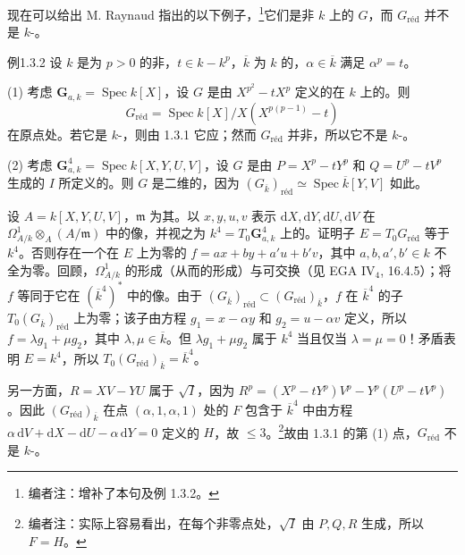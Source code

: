 现在可以给出 M. Raynaud 指出的以下例子，\footnote{编者注：增补了本句及例 1.3.2。}它们是非 $k$ 上的 $G$，而 $G_{\mathrm{r\text{é}d}}$ 并不是 $k$-。
\begin{SGAresult}{例}{1.3.2}
设 $k$ 是为 $p>0$ 的非，$t\in k-k^p$，$\overline k$ 为 $k$ 的，$\alpha\in\overline k$ 满足 $\alpha^p=t$。

(1) 考虑 $\mathbf G_{a,k}=\operatorname{Spec}k[X]$，设 $G$ 是由 $X^{p^2}-tX^p$ 定义的在 $k$ 上的。则
\[
G_{\mathrm{r\text{é}d}}=\operatorname{Spec}k[X]/X(X^{p(p-1)}-t)
\]
在原点处。若它是 $k$-，则由 1.3.1 它应；然而 $G_{\mathrm{r\text{é}d}}$ 并非，所以它不是 $k$-。

(2) 考虑 $\mathbf G_{a,k}^4=\operatorname{Spec}k[X,Y,U,V]$，设 $G$ 是由 $P=X^p-tY^p$ 和 $Q=U^p-tV^p$ 生成的 $I$ 所定义的。则 $G$ 是二维的，因为 $(G_{\overline k})_{\mathrm{r\text{é}d}}\simeq\operatorname{Spec}\overline k[Y,V]$ 如此。

设 $A=k[X,Y,U,V]$，$\mathfrak m$ 为其。以 $x,y,u,v$ 表示 $\mathrm dX,\mathrm dY,\mathrm dU,\mathrm dV$ 在 $\Omega^1_{A/k}\otimes_A(A/\mathfrak m)$ 中的像，并视之为 $k^4=T_0\mathbf G_{a,k}^4$ 上的。证明子 $E=T_0G_{\mathrm{r\text{é}d}}$ 等于 $k^4$。否则存在一个在 $E$ 上为零的 $f=ax+by+a'u+b'v$，其中 $a,b,a',b'\in k$ 不全为零。回顾，$\Omega^1_{A/k}$ 的形成（从而的形成）与可交换（见 EGA IV$_4$, 16.4.5）；将 $f$ 等同于它在 $(\overline k^4)^*$ 中的像。由于 $(G_{\overline k})_{\mathrm{r\text{é}d}}\subset(G_{\mathrm{r\text{é}d}})_{\overline k}$，$f$ 在 $\overline k^4$ 的子 $T_0(G_{\overline k})_{\mathrm{r\text{é}d}}$ 上为零；该子由方程 $g_1=x-\alpha y$ 和 $g_2=u-\alpha v$ 定义，所以 $f=\lambda g_1+\mu g_2$，其中 $\lambda,\mu\in\overline k$。但 $\lambda g_1+\mu g_2$ 属于 $k^4$ 当且仅当 $\lambda=\mu=0$！矛盾表明 $E=k^4$，所以 $T_0(G_{\mathrm{r\text{é}d}})_{\overline k}=\overline k^4$。

另一方面，$R=XV-YU$ 属于 $\sqrt I$，因为 $R^p=(X^p-tY^p)V^p-Y^p(U^p-tV^p)$。因此 $(G_{\mathrm{r\text{é}d}})_{\overline k}$ 在点 $(\alpha,1,\alpha,1)$ 处的 $F$ 包含于 $\overline k^4$ 中由方程 $\alpha\,\mathrm dV+\mathrm dX-\mathrm dU-\alpha\,\mathrm dY=0$ 定义的 $H$，故 $\leq3$。\footnote{编者注：实际上容易看出，在每个非零点处，$\sqrt I$ 由 $P,Q,R$ 生成，所以 $F=H$。}故由 1.3.1 的第 (1) 点，$G_{\mathrm{r\text{é}d}}$ 不是 $k$-。
\end{SGAresult}

